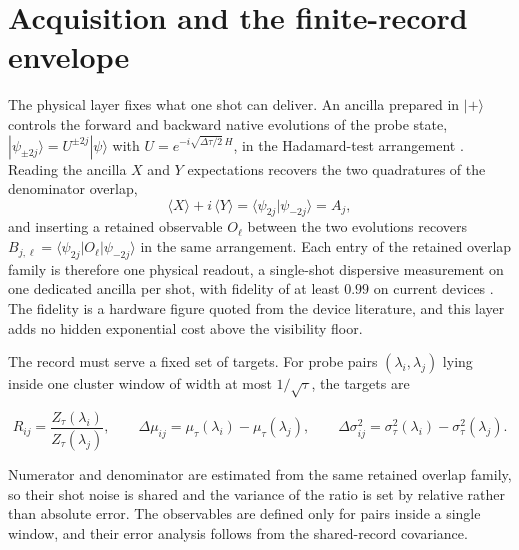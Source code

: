 \section{Acquisition and the finite-record envelope}\label{sec:N4}

The physical layer fixes what one shot can deliver. An ancilla prepared in $|+\rangle$ controls the forward and backward native evolutions of the probe state, $|\psi_{\pm 2j}\rangle = U^{\pm 2j}|\psi\rangle$ with $U = e^{-i\sqrt{\Delta\tau/2}\,H}$, in the Hadamard-test arrangement \cite{knill1998power}. Reading the ancilla $X$ and $Y$ expectations recovers the two quadratures of the denominator overlap,
\[
\langle X\rangle + i\,\langle Y\rangle = \langle\psi_{2j}|\psi_{-2j}\rangle = A_j ,
\]
and inserting a retained observable $O_\ell$ between the two evolutions recovers $B_{j,\ell} = \langle\psi_{2j}|O_\ell|\psi_{-2j}\rangle$ in the same arrangement. Each entry of the retained overlap family is therefore one physical readout, a single-shot dispersive measurement on one dedicated ancilla per shot, with fidelity of at least $0.99$ on current devices \cite{krantz2019engineer, marxer2023long}. The fidelity is a hardware figure quoted from the device literature, and this layer adds no hidden exponential cost above the visibility floor.

The record must serve a fixed set of targets. For probe pairs $(\lambda_i, \lambda_j)$ lying inside one cluster window of width at most $1/\sqrt{\tau}$, the targets are
\begin{widetext}
\[
R_{ij} = \frac{Z_\tau(\lambda_i)}{Z_\tau(\lambda_j)}, \qquad
\Delta\mu_{ij} = \mu_\tau(\lambda_i) - \mu_\tau(\lambda_j), \qquad
\Delta\sigma^2_{ij} = \sigma^2_\tau(\lambda_i) - \sigma^2_\tau(\lambda_j).
\]
\end{widetext}
Numerator and denominator are estimated from the same retained overlap family, so their shot noise is shared and the variance of the ratio is set by relative rather than absolute error. The observables are defined only for pairs inside a single window, and their error analysis follows from the shared-record covariance.

